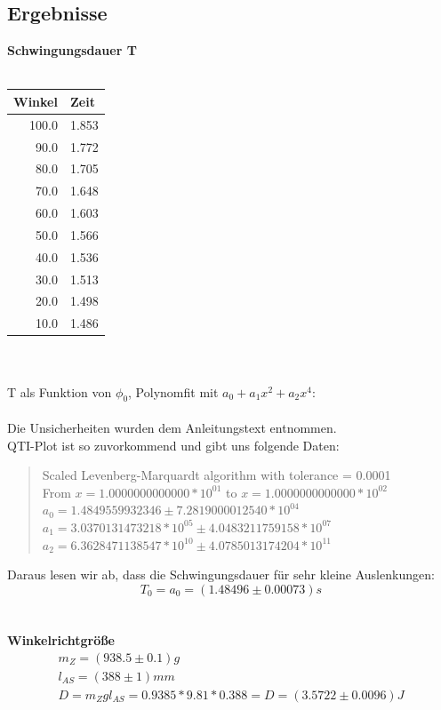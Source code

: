 \documentclass{article}
\begin{document}
\subsection{Ergebnisse}
\textbf{Schwingungsdauer T}\\
\\
\begin{tabular}{ r | l }
Winkel & Zeit \\ \hline
100.0 & 1.853\\
90.0	 & 1.772\\
80.0	 & 1.705\\
70.0	 & 1.648\\
60.0	 & 1.603\\
50.0 & 1.566\\
40.0	 & 1.536\\
30.0	 & 1.513\\
20.0	 & 1.498\\
10.0	 & 1.486\\
\end{tabular}
\\
\\
T als Funktion von $\phi_0$, Polynomfit mit $a_0+a_1x^2+a_2x^4$: \\
\\
Die Unsicherheiten wurden dem Anleitungstext entnommen.\\
QTI-Plot ist so zuvorkommend und gibt uns folgende Daten:
\begin{quote}
Scaled Levenberg-Marquardt algorithm with tolerance = 0.0001\\
From $x = 1.0000000000000*10^{01}$ to $x = 1.0000000000000*10^{02}$\\
$a_0 = 1.4849559932346  \pm 7.2819000012540*10^{04}$\\
$a_1 = 3.0370131473218*10^{05} \pm 4.0483211759158*10^{07}$\\
$a_2 = 6.3628471138547*10^{10} \pm 4.0785013174204*10^{11}$
\end{quote}
Daraus lesen wir ab, dass die Schwingungsdauer für sehr kleine Auslenkungen:\\  $$\boxed{T_0=a_0=(1.48496 \pm 0.00073)s}$$\\
\\
\textbf{Winkelrichtgröße}\\
\begin{gather*}
m_Z=(938.5 \pm 0.1)g\\
l_{AS}=(388 \pm 1)mm\\
D=m_Zgl_{AS}=0.9385 * 9.81 * 0.388 = \boxed{D=(3.5722 \pm 0.0096)J}
\end{gather*}
\end{document}
